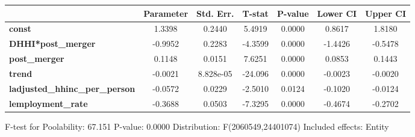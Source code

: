 \documentclass{report}
\begin{document}
\begin{center}
\begin{tabular}{lclc}
\bottomrule
\end{tabular}
\begin{tabular}{lcccccc}
                                       & \textbf{Parameter} & \textbf{Std. Err.} & \textbf{T-stat} & \textbf{P-value} & \textbf{Lower CI} & \textbf{Upper CI}  \\
\midrule
\textbf{const}                         &       1.3398       &       0.2440       &      5.4919     &      0.0000      &       0.8617      &       1.8180       \\
\textbf{DHHI*post\_merger}             &      -0.9952       &       0.2283       &     -4.3599     &      0.0000      &      -1.4426      &      -0.5478       \\
\textbf{post\_merger}                  &       0.1148       &       0.0151       &      7.6251     &      0.0000      &       0.0853      &       0.1443       \\
\textbf{trend}                         &      -0.0021       &     8.828e-05      &     -24.096     &      0.0000      &      -0.0023      &      -0.0020       \\
\textbf{ladjusted\_hhinc\_per\_person} &      -0.0572       &       0.0229       &     -2.5010     &      0.0124      &      -0.1020      &      -0.0124       \\
\textbf{lemployment\_rate}             &      -0.3688       &       0.0503       &     -7.3295     &      0.0000      &      -0.4674      &      -0.2702       \\
\bottomrule
\end{tabular}
\end{center}

F-test for Poolability: 67.151 \newline
 P-value: 0.0000 \newline
 Distribution: F(2060549,24401074) \newline
  \newline
 Included effects: Entity
\end{document}
